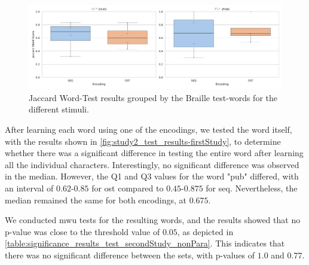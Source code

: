 \begin{figure}
    \centering
    \includegraphics[width=\linewidth]{src/pictures/Study2Data_Experiment/Eval/learn_jaccard_word_score-2.pdf}
    \caption{Jaccard Word-Test results grouped by the Braille test-words for the different stimuli.}
    \label{fig:study2_test_results-firstStudy}
\end{figure}

After learning each word using one of the encodings, we tested the word itself, with the results shown in \autoref{fig:study2_test_results-firstStudy}, to determine whether there was a significant difference in testing the entire word after learning all the individual characters.
Interestingly, no significant difference was observed in the median. However, the Q1 and Q3 values for the word "pub" differed, with an interval of $0.62$-$0.85$ for \gls{ost} compared to $0.45$-$0.875$ for \gls{seq}.
Nevertheless, the median remained the same for both encodings, at $0.675$.

We conducted \gls{mwu} tests for the resulting words, and the results showed that no p-value was close to the threshold value of $0.05$, as depicted in \autoref{table:significance_results_test_secondStudy_nonPara}. This indicates that there was no significant difference between the sets, with p-values of $1.0$ and $0.77$.

\begin{table}[ht]
\caption{Results of the \gls{mwu} tests for significance for the different Braille tests-words with a Cohens d Effect Size.}
\label{table:significance_results_test_secondStudy_nonPara}
\end{table}


